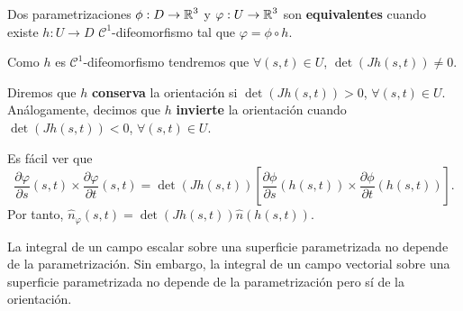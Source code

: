 \begin{definition}
Dos parametrizaciones $\displaystyle \phi: D \to \mathbb{R}^{3} $ y $\displaystyle \varphi: U \to \mathbb{R}^{3} $ son \textbf{equivalentes} cuando existe $\displaystyle h : U \to D $ $\displaystyle \mathcal{C}^{1} $-difeomorfismo tal que $\displaystyle \varphi = \phi\circ h $. 
\end{definition}
\begin{observation}
Como $\displaystyle h $ es $\displaystyle \mathcal{C}^{1} $-difeomorfismo tendremos que $\displaystyle \forall\left(s,t\right)\in U $, $\displaystyle \det\left(Jh\left(s,t\right)\right)\neq 0 $. 
\end{observation}
\begin{definition}
	Diremos que $\displaystyle h $ \textbf{conserva} la orientación si $\displaystyle \det\left(Jh\left(s,t\right)\right)>0 $, $\displaystyle \forall \left(s,t\right)\in U $. Análogamente, decimos que $\displaystyle h $ \textbf{invierte} la orientación cuando $\displaystyle \det\left(Jh\left(s,t\right)\right)<0 $, $\displaystyle \forall \left(s,t\right)\in U $. 
\end{definition}
\begin{observation}
Es fácil ver que 
\[\frac{\partial \varphi}{\partial s}\left(s,t\right) \times \frac{\partial \varphi}{\partial t}\left(s,t\right)=\det\left(Jh\left(s,t\right)\right)\left[\frac{\partial \phi}{\partial s}\left(h\left(s,t\right)\right) \times \frac{\partial \phi}{\partial t}\left(h\left(s,t\right)\right)\right]  .\]
Por tanto, $\displaystyle \hat{n}_{\varphi}\left(s,t\right)=\det\left(Jh\left(s,t\right)\right)\hat{n}\left(h\left(s,t\right)\right) $. 
\end{observation}
\begin{prop}
La integral de un campo escalar sobre una superficie parametrizada no depende de la parametrización. Sin embargo, la integral de un campo vectorial sobre una superficie parametrizada no depende de la parametrización pero sí de la orientación.
\end{prop}

